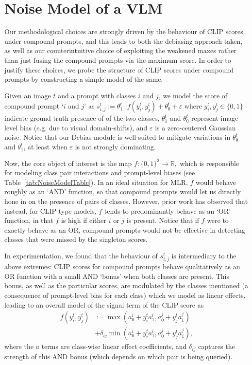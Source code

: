 \section{Noise Model of a VLM}
\label{sec:noisemodel}



Our methodological choices are strongly driven by the behaviour of CLIP scores under compound prompts, and this leads to both the debiasing approach taken, as well as our counterintuitive choice of exploiting the weakened maxes rather than just fusing the compound prompts via the maximum score. In order to justify these choices, we probe the structure of CLIP scores under compound prompts by constructing a simple model of the same.

Given an image $t$ and a prompt with classes $i$ and $j$, we model the score of compound prompt `$i$ and $j$' as \mbox{$s_{i,j}^t := \theta_1^t \cdot f(y_i^t, y_j^t) + \theta_0^t + \varepsilon$}
where $y_i^t, y_j^t \in \{0,1\}$ indicate ground-truth presence of of the two classes, $\theta_1^t$ and $\theta_0^t$ represent image-level bias (e.g. due to visual domain-shifts), and $\varepsilon$ is a zero-centered Gaussian noise.
Notice that our Debias module is well-suited to mitigate variations in $\theta_0^t$ and $\theta_1^t$, at least when $\varepsilon$ is not strongly dominating. 

Now, the core object of interest is the map $f : \{0,1\}^2 \to \mathbb{R},$ which is responsible for modeling class pair interactions and prompt-level biases (see Table~\ref{tab:NoiseModelTable}). In an ideal situation for MLR, $f$ would behave roughly as an `AND' function, so that compound prompts would let us directly hone in on the presence of pairs of classes. However, prior work has observed that instead, for CLIP-type models, $f$ tends to predominantly behave as an `OR' function, in that $f$ is high if either $i$ or $j$ is present. Notice that if $f$ were to exactly behave as an OR, compound prompts would not be effective in detecting classes that were missed by the singleton scores.

In experimentation, we found that the behaviour of $s_{i,j}^t$ is intermediary to the above extremes: CLIP scores for compound prompts behave qualitatively as an OR function with a small AND `bonus' when both classes are present. This bonus, as well as the particular scores, are modulated by the classes mentioned (a consequence of prompt-level bias for each class) which we model as linear effects, leading to an overall model of the signal term of the CLIP score as \begin{align}
f(y_i^t, y_j^t) &:= \max(a_0^i + y_i^t a_1^i, a_0^j + y_j^t a_1^j) \nonumber \\ &+ \delta_{ij} \min(a_0^i + y_i^t a_1^i, a_0^j + y_j^t a_1^j),
\end{align} where the $a$ terms are class-wise linear effect coefficients, and $\delta_{ij}$ captures the strength of this AND bonus (which depends on which pair is being queried).

